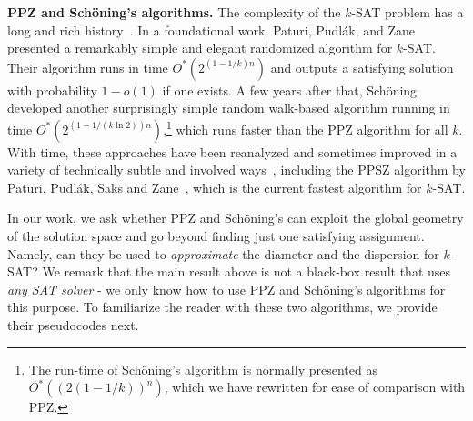 \documentclass[11pt, letterpaper]{article}
\theoremstyle{definition}
\newcommand{\sch}{Sch\"{o}ning\xspace}
\begin{document}
\medskip\noindent
\textbf{PPZ and Sch\"{o}ning's algorithms.} The complexity of the $k$-SAT problem has a long and rich history~\cite{impagliazzo2001complexity,impagliazzo2001problems,calabro2009exponential,fomin2013exact}. In a foundational work, Paturi, Pudl\'ak, and Zane~\cite{PPZ} presented a remarkably simple and elegant randomized algorithm for $k$-SAT. Their algorithm runs in time $O^*\!\left(2^{ (1-1/k)n}\right)$ and outputs a satisfying solution with probability $1-o(1)$ if one exists. A few years after that, \sch~\cite{schoning2002probabilistic} developed another surprisingly simple random walk-based algorithm running in time $O^*\!\left(2^{ (1-1/(k \ln 2))n}\right)$,\footnote{The run-time of \sch's algorithm is normally presented as $O^*\left((2(1-1/k))^n\right)$, which we have rewritten for ease of comparison with PPZ.} which runs faster than the PPZ algorithm for all $k$. 
With time, these approaches have been reanalyzed and sometimes improved in a variety of technically subtle and involved ways~\cite{hofmeister2002probabilistic, baumer2004improving, paturi2005,hertli2010improving,hertli2014breaking,liu2018chain,SchederSteinberger,hansen2019faster, PPZmoreisbetter,scheder2022ppsz}, including the PPSZ algorithm by Paturi, Pudl\'ak, Saks and Zane~\cite{paturi2005}, which is the current fastest algorithm for $k$-SAT. 

In our work, we ask whether PPZ and \sch's can exploit the global geometry of the solution space and go beyond finding just one satisfying assignment. Namely, can they be used to \emph{approximate} the diameter and the dispersion for $k$-SAT? We remark that the main result above is not a black-box result that uses \emph{any SAT solver} - we only know how to use PPZ and Sch\"{o}ning's algorithms for this purpose. To familiarize the reader with these two algorithms, we provide their pseudocodes next. 
\end{document}
